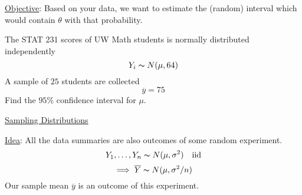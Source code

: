 \underline{Objective}: Based on your data, we want to estimate the (random)
interval which would contain $ \theta $ with that probability.
\begin{exbox}
    \begin{example}
        The STAT 231 scores of UW Math students is normally distributed independently
        \[ Y_i \thicksim N(\mu,64) \]
        A sample of $ 25 $ students are collected
        \[ \overline{y}=75 \]
        Find the $ 95\% $ confidence interval for $ \mu $.
    \end{example}
\end{exbox}
\underline{Sampling Distributions}

\underline{Idea}: All the data summaries are also outcomes of some random experiment.
\[ Y_1,\ldots ,Y_n \thicksim N(\mu,\sigma^2) \quad\text{iid}\]
\[ \implies \overline{Y} \thicksim N(\mu,\sigma^2/n) \]
Our sample mean $ \overline{y} $ is an outcome of this experiment.
